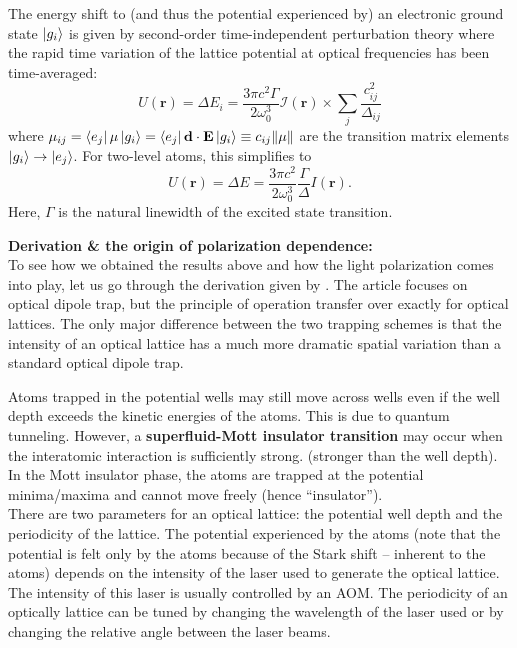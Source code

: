 \documentclass{book}
\theoremstyle{definition}
\newcommand{\I}{\mathcal{I}}
\newcommand{\f}[2]{\frac{#1}{#2}}
\begin{document}
The energy shift to (and thus the potential experienced by) an electronic ground state $\ket{g_i}$ is given by second-order time-independent perturbation theory where the rapid time variation of the lattice potential at optical frequencies has been time-averaged:
\begin{equation*}
U(\mathbf{r}) = \Delta E_i = \f{3\pi c^2 \Gamma}{2\omega_0^3}\I(\mathbf{r}) \times  \sum_j \f{c_{ij}^2}{\Delta_{ij}}
\end{equation*}
where $\mu_{ij} = \bra{e_j}\mu \ket{g_i}  = \bra{e_j} \mathbf{d}\cdot \mathbf{E} \ket{g_i} \equiv c_{ij}\norm{\mu}$ are the transition matrix elements $\ket{g_i} \to \ket{e_j}$. For two-level atoms, this simplifies to 
\begin{equation*}
U(\mathbf{r}) = \Delta E = \f{3\pi c^2}{2\omega_0^3}\f{\Gamma}{\Delta} I(\mathbf{r}).
\end{equation*}
Here, $\Gamma$ is the natural linewidth of the excited state transition. 



\begin{framed}
	\noindent \textbf{Derivation \& the origin of polarization dependence:}\\
	
	\noindent To see how we obtained the results above and how the light polarization comes into play, let us go through the derivation given by \cite{grimm2000optical}. The article focuses on optical dipole trap, but the principle of operation transfer over exactly for optical lattices. The only major difference between the two trapping schemes is that the intensity of an optical lattice has a much more dramatic spatial variation than a standard optical dipole trap.\\
	
	
	 
\end{framed}


Atoms trapped in the potential wells may still move across wells even if the well depth exceeds the kinetic energies of the atoms. This is due to quantum tunneling. However, a \textbf{superfluid-Mott insulator transition} may occur when the interatomic interaction is sufficiently strong. (stronger than the well depth). In the Mott insulator phase, the atoms are trapped at the potential minima/maxima and cannot move freely (hence ``insulator''). \\


There are two parameters for an optical lattice: the potential well depth and the periodicity of the lattice. The potential experienced by the atoms (note that the potential is felt only by the atoms because of the Stark shift -- inherent to the atoms) depends on the intensity of the laser used to generate the optical lattice. The intensity of this laser is usually controlled by an AOM. The periodicity of an optically lattice can be tuned by changing the wavelength of the laser used or by changing the relative angle between the laser beams. 
\end{document}
